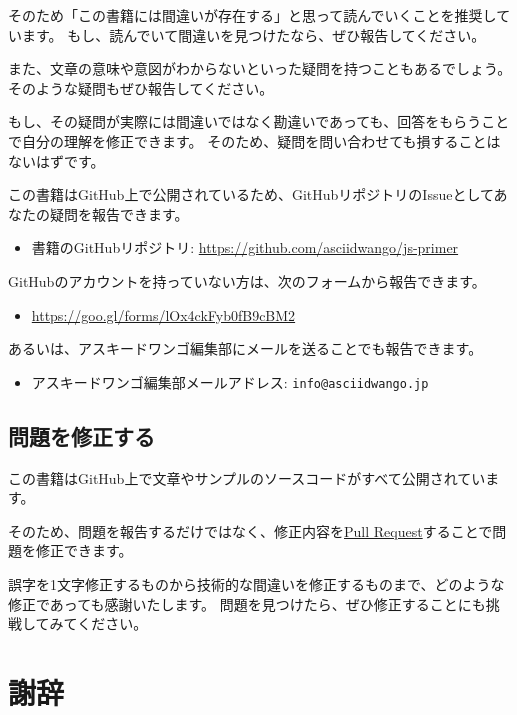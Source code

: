 そのため「この書籍には間違いが存在する」と思って読んでいくことを推奨しています。
もし、読んでいて間違いを見つけたなら、ぜひ報告してください。

また、文章の意味や意図がわからないといった疑問を持つこともあるでしょう。
そのような疑問もぜひ報告してください。

もし、その疑問が実際には間違いではなく勘違いであっても、回答をもらうことで自分の理解を修正できます。
そのため、疑問を問い合わせても損することはないはずです。

この書籍はGitHub上で公開されているため、GitHubリポジトリのIssueとしてあなたの疑問を報告できます。

\begin{itemize}
\item 書籍のGitHubリポジトリ: \url{https://github.com/asciidwango/js-primer}
\end{itemize}

GitHubのアカウントを持っていない方は、次のフォームから報告できます。
\begin{itemize}
\item \url{https://goo.gl/forms/lOx4ckFyb0fB9cBM2}
\end{itemize}

あるいは、アスキードワンゴ編集部にメールを送ることでも報告できます。
\begin{itemize}
\item アスキードワンゴ編集部メールアドレス: \texttt{info@asciidwango.jp}
\end{itemize}

\hypertarget{pull-request}{%
\subsection*{問題を修正する}\label{pull-request}}

この書籍はGitHub上で文章やサンプルのソースコードがすべて公開されています。

そのため、問題を報告するだけではなく、修正内容を\href{https://help.github.com/articles/about-pull-requests/}{Pull
Request}することで問題を修正できます。

誤字を1文字修正するものから技術的な間違いを修正するものまで、どのような修正であっても感謝いたします。
問題を見つけたら、ぜひ修正することにも挑戦してみてください。

\hypertarget{thanks}{%
\section*{謝辞}\label{thanks}}

